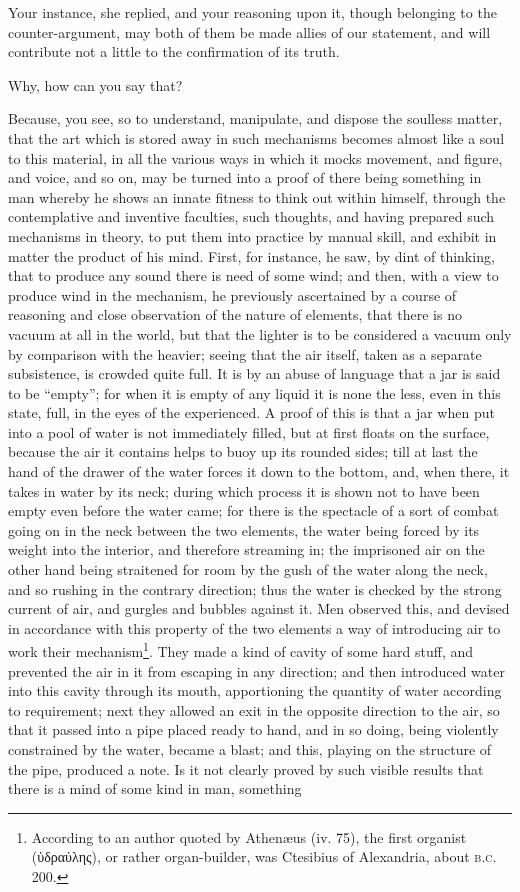 Your instance, she replied, and your reasoning upon it, though belonging to the counter-argument, may both of them be made allies of our statement, and will contribute not a little to the confirmation of its truth.

Why, how can you say that?

Because, you see, so to understand, manipulate, and dispose the soulless matter, that the art which is stored away in such mechanisms becomes almost like a soul to this material, in all the various ways in which it mocks movement, and figure, and voice, and so on, may be turned into a proof of there being something in man whereby he shows an innate fitness to think out within himself, through the contemplative and inventive faculties, such thoughts, and having prepared such mechanisms in theory, to put them into practice by manual skill, and exhibit in matter the product of his mind. First, for instance, he saw, by dint of thinking, that to produce any sound there is need of some wind; and then, with a view to produce wind in the mechanism, he previously ascertained by a course of reasoning and close observation of the nature of elements, that there is no vacuum at all in the world, but that the lighter is to be considered a vacuum only by comparison with the heavier; seeing that the air itself, taken as a separate subsistence, is crowded quite full. It is by an abuse of language that a jar is said to be “empty”; for when it is empty of any liquid it is none the less, even in this state, full, in the eyes of the experienced. A proof of this is that a jar when put into a pool of water is not immediately filled, but at first floats on the surface, because the air it contains helps to buoy up its rounded sides; till at last the hand of the drawer of the water forces it down to the bottom, and, when there, it takes in water by its neck; during which process it is shown not to have been empty even before the water came; for there is the spectacle of a sort of combat going on in the neck between the two elements, the water being forced by its weight into the interior, and therefore streaming in; the imprisoned air on the other hand being straitened for room by the gush of the water along the neck, and so rushing in the contrary direction; thus the water is checked by the strong current of air, and gurgles and bubbles against it. Men observed this, and devised in accordance with this property of the two elements a way of introducing air to work their mechanism\footnote{According to an author quoted by Athenæus (iv. 75), the first organist (\textgreek{ὑδραύλης}), or rather organ-builder, was Ctesibius of Alexandria, about \textsc{b.c.} 200.}. They made a kind of cavity of some hard stuff, and prevented the air in it from escaping in any direction; and then introduced water into this cavity through its mouth, apportioning the quantity of water according to requirement; next they allowed an exit in the opposite direction to the air, so that it passed into a pipe placed ready to hand, and in so doing, being violently constrained by the water, became a blast; and this, playing on the structure of the pipe, produced a note. Is it not clearly proved by such visible results that there is a mind of some kind in man, something 